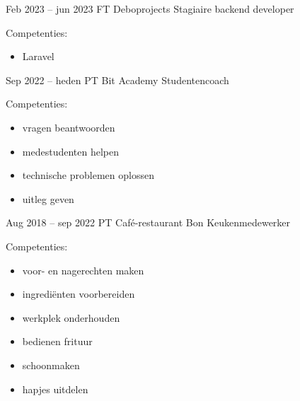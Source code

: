 \documentclass[
	11pt, %
]{FreemanCV}
\begin{document}
\begin{paracol}{2}
	\jobentry
	{Feb 2023 -- jun 2023} %
	{FT} %
	{Deboprojects} %
	{Stagiaire backend developer} %
	{Competenties:
		\begin{itemize}
			\item Laravel
		\end{itemize}
	} %

	\jobentry
	{Sep 2022 -- heden} %
	{PT} %
	{Bit Academy} %
	{Studentencoach} %
	{Competenties:
		\begin{itemize}
			\item vragen beantwoorden
			\item medestudenten helpen
			\item technische problemen oplossen
			\item uitleg geven
		\end{itemize}
	} %

	\jobentry
	{Aug 2018 -- sep 2022} %
	{PT} %
	{Café-restaurant Bon} %
	{Keukenmedewerker} %
	{Competenties:
		\begin{itemize}
			\item voor- en nagerechten maken
			\item ingrediënten voorbereiden
			\item werkplek onderhouden
			\item bedienen frituur
			\item schoonmaken
			\item hapjes uitdelen
		\end{itemize}
	} %







\end{paracol}
\end{document}
